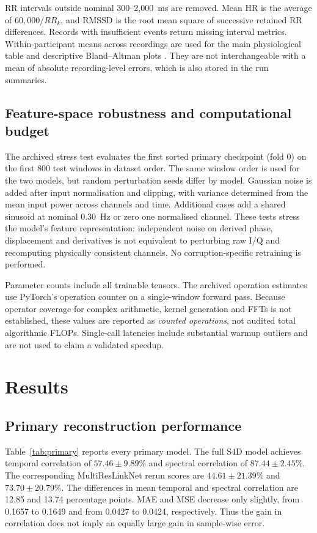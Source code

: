 \documentclass[11pt,a4paper]{article}
\newcommand{\Full}{full S4D model}
\begin{document}
RR intervals outside nominal 300--2,000~ms are removed. Mean HR is the average of
$60{,}000/RR_k$, and RMSSD is the root mean square of successive retained RR differences.
Records with insufficient events return missing interval metrics. Within-participant means
across recordings are used for the main physiological table and descriptive Bland--Altman
plots \citep{blandaltman}. They are not interchangeable with a mean of absolute
recording-level errors, which is also stored in the run summaries.

\subsection{Feature-space robustness and computational budget}

The archived stress test evaluates the first sorted primary checkpoint (fold 0) on the first
800 test windows in dataset order. The same window order is used for the two models, but
random perturbation seeds differ by model. Gaussian noise is added after input
normalisation and clipping, with variance determined from the mean input power across
channels and time. Additional cases add a shared sinusoid at nominal 0.30~Hz or zero one
normalised channel. These tests stress the model's feature representation: independent
noise on derived phase, displacement and derivatives is not equivalent to perturbing raw
I/Q and recomputing physically consistent channels. No corruption-specific retraining is
performed.

Parameter counts include all trainable tensors. The archived operation estimates use
PyTorch's operation counter on a single-window forward pass. Because operator coverage
for complex arithmetic, kernel generation and FFTs is not established, these values are
reported as \emph{counted operations}, not audited total algorithmic FLOPs. Single-call
latencies include substantial warmup outliers and are not used to claim a validated speedup.

\section{Results}

\subsection{Primary reconstruction performance}

Table~\ref{tab:primary} reports every primary model. The \Full{} achieves temporal
correlation of $57.46\pm9.89\%$ and spectral correlation of $87.44\pm2.45\%$. The corresponding
MultiResLinkNet rerun scores are $44.61\pm21.39\%$ and $73.70\pm20.79\%$. The differences in
mean temporal and spectral correlation are 12.85 and 13.74 percentage points. MAE and MSE
decrease only slightly, from 0.1657 to 0.1649 and from 0.0427 to 0.0424, respectively.
Thus the gain in correlation does not imply an equally large gain in sample-wise error.
\end{document}
